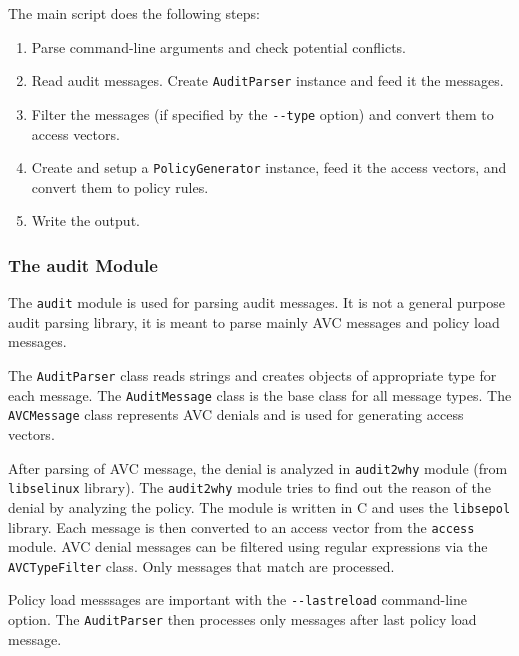 The main script does the following steps:
\begin{enumerate}
    \item Parse command-line arguments and check potential conflicts.
    \item Read audit messages. Create \texttt{AuditParser} instance and feed it
        the messages.
    \item Filter the messages (if specified by the \texttt{-{}-type} option) and
        convert them to access vectors.
    \item Create and setup a \texttt{PolicyGenerator} instance, feed it the
        access vectors, and convert them to policy rules.
    \item Write the output.
\end{enumerate}

\subsubsection{The audit Module}

The \texttt{audit} module is used for parsing audit messages. It is not a
general purpose audit parsing library, it is meant to parse mainly AVC messages
and policy load messages.

The \texttt{AuditParser} class reads strings and creates objects of appropriate
type for each message. The \texttt{AuditMessage} class is the base class for all
message types. The \texttt{AVCMessage} class represents AVC denials and is used
for generating access vectors.

After parsing of AVC message, the denial is analyzed in \texttt{audit2why}
module (from \texttt{libselinux} library). The \texttt{audit2why} module tries
to find out the reason of the denial by analyzing the policy. The module is
written in C and uses the \texttt{libsepol} library. Each message is then
converted to an access vector from the \texttt{access} module. AVC denial
messages can be filtered using regular expressions via the
\texttt{AVCTypeFilter} class. Only messages that match are processed.

Policy load messsages are important with the \texttt{-{}-lastreload}
command-line option. The \texttt{AuditParser} then processes only messages after
last policy load message.

